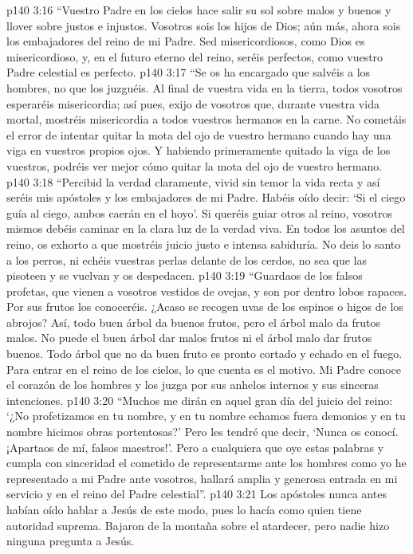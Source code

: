\vs p140 3:16 “Vuestro Padre en los cielos hace salir su sol sobre malos y buenos y llover sobre justos e injustos. Vosotros sois los hijos de Dios; aún más, ahora sois los embajadores del reino de mi Padre. Sed misericordiosos, como Dios es misericordioso, y, en el futuro eterno del reino, seréis perfectos, como vuestro Padre celestial es perfecto.
\vs p140 3:17 “Se os ha encargado que salvéis a los hombres, no que los juzguéis. Al final de vuestra vida en la tierra, todos vosotros esperaréis misericordia; así pues, exijo de vosotros que, durante vuestra vida mortal, mostréis misericordia a todos vuestros hermanos en la carne. No cometáis el error de intentar quitar la mota del ojo de vuestro hermano cuando hay una viga en vuestros propios ojos. Y habiendo primeramente quitado la viga de los vuestros, podréis ver mejor cómo quitar la mota del ojo de vuestro hermano.
\vs p140 3:18 “Percibid la verdad claramente, vivid sin temor la vida recta y así seréis mis apóstoles y los embajadores de mi Padre. Habéis oído decir: ‘Si el ciego guía al ciego, ambos caerán en el hoyo’. Si queréis guiar otros al reino, vosotros mismos debéis caminar en la clara luz de la verdad viva. En todos los asuntos del reino, os exhorto a que mostréis juicio justo e intensa sabiduría. No deis lo santo a los perros, ni echéis vuestras perlas delante de los cerdos, no sea que las pisoteen y se vuelvan y os despedacen.
\vs p140 3:19 “Guardaos de los falsos profetas, que vienen a vosotros vestidos de ovejas, y son por dentro lobos rapaces. Por sus frutos los conoceréis. ¿Acaso se recogen uvas de los espinos o higos de los abrojos? Así, todo buen árbol da buenos frutos, pero el árbol malo da frutos malos. No puede el buen árbol dar malos frutos ni el árbol malo dar frutos buenos. Todo árbol que no da buen fruto es pronto cortado y echado en el fuego. Para entrar en el reino de los cielos, lo que cuenta es el motivo. Mi Padre conoce el corazón de los hombres y los juzga por sus anhelos internos y sus sinceras intenciones.
\vs p140 3:20 “Muchos me dirán en aquel gran día del juicio del reino: ‘¿No profetizamos en tu nombre, y en tu nombre echamos fuera demonios y en tu nombre hicimos obras portentosas?’ Pero les tendré que decir, ‘Nunca os conocí. ¡Apartaos de mí, falsos maestros!’. Pero a cualquiera que oye estas palabras y cumpla con sinceridad el cometido de representarme ante los hombres como yo he representado a mi Padre ante vosotros, hallará amplia y generosa entrada en mi servicio y en el reino del Padre celestial”.
\vs p140 3:21 \pc Los apóstoles nunca antes habían oído hablar a Jesús de este modo, pues lo hacía como quien tiene autoridad suprema. Bajaron de la montaña sobre el atardecer, pero nadie hizo ninguna pregunta a Jesús.
